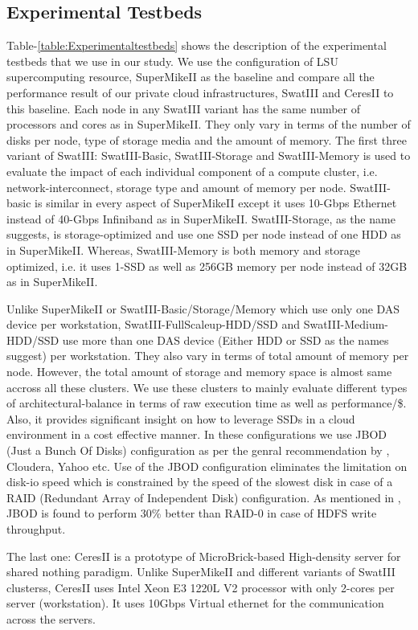 \documentclass[conference]{IEEEtran}
\begin{document}
\subsection {Experimental Testbeds}
Table-\ref{table:Experimentaltestbeds} shows the description of the experimental testbeds that we use in our study.
We use the configuration of LSU supercomputing resource, SuperMikeII as the baseline and compare all the performance result of our private cloud infrastructures, SwatIII and CeresII to this baseline.
Each node in any SwatIII variant has the same number of processors and cores as in SuperMikeII. 
They only vary in terms of the number of disks per node, type of storage media and the amount of memory.
The first three variant of SwatIII: SwatIII-Basic, SwatIII-Storage and SwatIII-Memory is used to evaluate the impact of each individual component of a compute cluster, i.e. network-interconnect, storage type and amount of memory per node.
SwatIII-basic is similar in every aspect of SuperMikeII except it uses 10-Gbps Ethernet instead of 40-Gbps Infiniband as in SuperMikeII.
SwatIII-Storage, as the name suggests, is storage-optimized and use one SSD per node instead of one HDD as in SuperMikeII.
Whereas, SwatIII-Memory is both memory and storage optimized, i.e. it uses 1-SSD as well as 256GB memory per node instead of 32GB as in SuperMikeII.

Unlike SuperMikeII or SwatIII-Basic/Storage/Memory which use only one DAS device per workstation, SwatIII-FullScaleup-HDD/SSD and SwatIII-Medium-HDD/SSD use more than one DAS device (Either HDD or SSD as the names suggest) per workstation.
They also vary in terms of total amount of memory per node.
However, the total amount of storage and memory space is almost same accross all these clusters.
We use these clusters to mainly evaluate different types of architectural-balance in terms of raw execution time as well as performance/\$.
Also, it provides significant insight on how to leverage SSDs in a cloud environment in a cost effective manner. 
In these configurations we use JBOD (Just a Bunch Of Disks) configuration as per the genral recommendation by \cite{fw:hadoop}, Cloudera, Yahoo etc.
Use of the JBOD configuration eliminates the limitation on disk-io speed which is constrained by the speed of the slowest disk in case of a RAID (Redundant Array of Independent Disk) configuration.
As mentioned in \cite{fw:hadoop}, JBOD is found to perform 30\% better than RAID-0 in case of HDFS write throughput.

The last one: CeresII is a prototype of MicroBrick-based High-density server for shared nothing paradigm.
Unlike SuperMikeII and different variants of SwatIII clusterss, CeresII uses Intel Xeon E3 1220L V2 processor with only 2-cores per server (workstation). 
It uses 10Gbps Virtual ethernet for the communication across the servers.  
\end{document}
